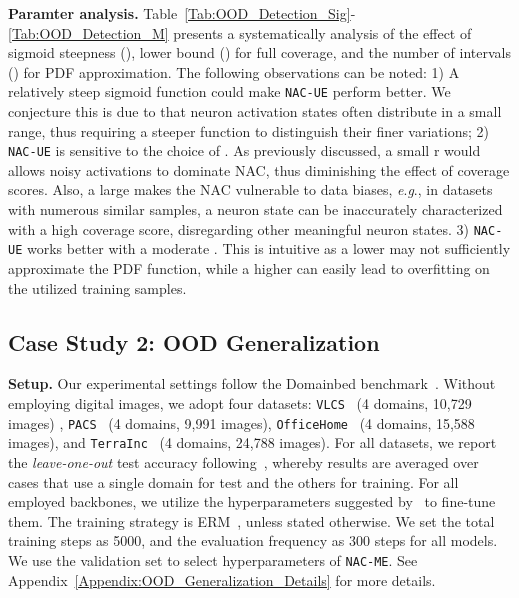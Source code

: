 \documentclass{article} \usepackage{iclr2024_conference,times}
\newcommand{\eg}{\textit{e}.\textit{g}.}
\newcommand{\bfstart}[1]{\noindent\textbf{#1.}}
\begin{document}
\bfstart{Paramter analysis} Table~\ref{Tab:OOD_Detection_Sig}-\ref{Tab:OOD_Detection_M} presents a systematically analysis of the effect of sigmoid steepness (), lower bound () for full coverage, and the number of intervals () for PDF approximation. The following observations can be noted: 
1) A relatively steep sigmoid function could make \texttt{NAC-UE} perform better. We conjecture this is due to that neuron activation states often distribute in a small range, thus requiring a steeper function to distinguish their finer variations;
2) \texttt{NAC-UE} is sensitive to the choice of . 
As previously discussed, a small r would allows noisy activations to dominate NAC, thus diminishing the effect of coverage scores. Also, a large  makes the NAC vulnerable to data biases, \eg, in datasets with numerous similar samples, a neuron state can be inaccurately characterized with a high coverage score, disregarding other meaningful neuron states.
3) \texttt{NAC-UE} works better with a moderate .
This is intuitive as a lower  may not sufficiently approximate the PDF function, while a higher  can easily lead to overfitting on the utilized training samples.



























\vspace{-1mm}
\subsection{Case Study 2: OOD Generalization}
\vspace{-1mm}
\label{Sec:Exp_OOD_Generalization}
\bfstart{Setup} Our experimental settings follow the Domainbed benchmark~\citep{Setup:DomainBed}. Without employing digital images, we adopt four datasets: \texttt{VLCS}~\citep{Dataset:VLCS} (4 domains, 10,729 images) , \texttt{PACS}~\citep{Dataset:PACS} (4 domains, 9,991 images), \texttt{OfficeHome}~\citep{Dataset:OfficeHome} (4 domains, 15,588 images), and \texttt{TerraInc}~\citep{Dataset:TerraIncognita} (4 domains, 24,788 images). 
For all datasets, we report the \textit{leave-one-out} test accuracy following~\citep{Setup:DomainBed}, whereby results are averaged over cases that use a single domain for test and the others for training. 
For all employed backbones, we utilize the hyperparameters suggested by~\citep{tech:swad} to fine-tune them. 
The training strategy is ERM~\citep{Baseline:ERM}, unless stated otherwise. 
We set the total training steps as 5000, and the evaluation frequency as 300 steps for all models. 
We use the validation set to select hyperparameters of \texttt{NAC-ME}. See Appendix~\ref{Appendix:OOD_Generalization_Details} for more details.
\end{document}
